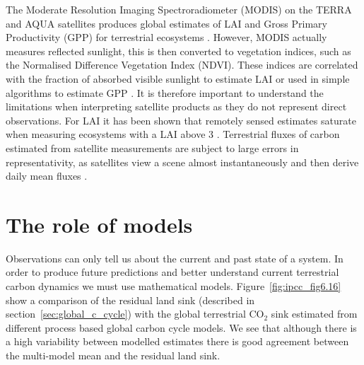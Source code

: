 \documentclass[12pt]{article}
\begin{document}
The Moderate Resolution Imaging Spectroradiometer (MODIS) on the TERRA and AQUA satellites produces global estimates of LAI and Gross Primary Productivity (GPP) for terrestrial ecosystems \citep{running2004continuous}. However, MODIS actually measures reflected sunlight, this is then converted to vegetation indices, such as the Normalised Difference Vegetation Index (NDVI). These indices are correlated with the fraction of absorbed visible sunlight to estimate LAI or used in simple algorithms to estimate GPP \citep{yuan2007deriving}. It is therefore important to understand the limitations when interpreting satellite products as they do not represent direct observations. For LAI it has been shown that remotely sensed estimates saturate when measuring ecosystems with a LAI above 3 \citep{myneni2002global}. Terrestrial fluxes of carbon estimated from satellite measurements are subject to large errors in representativity, as satellites view a scene almost instantaneously and then derive daily mean fluxes \citep{baldocchi2008turner}. 

\section{The role of models}

Observations can only tell us about the current and past state of a system. In order to produce future predictions and better understand current terrestrial carbon dynamics we must use mathematical models. Figure~\ref{fig:ipcc_fig6.16} show a comparison of the residual land sink (described in section~\ref{sec:global_c_cycle}) with the global terrestrial CO\(_{2}\) sink estimated from different process based global carbon cycle models. We see that although there is a high variability between modelled estimates there is good agreement between the multi-model mean and the residual land sink. 
\end{document}
